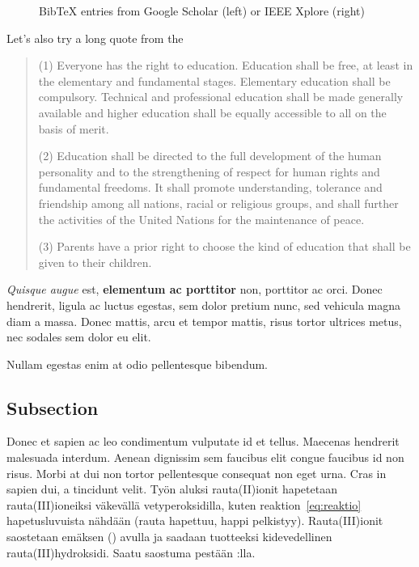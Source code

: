 \begin{figure}[ht]
  \centering
  \caption{BibTeX entries from Google Scholar (left) or IEEE Xplore (right)}
  \label{fig:bibtex}
\end{figure}

Let's also try a long quote from the 
\begin{quote}
(1) Everyone has the right to education. Education shall be free, at least in the elementary and fundamental stages. Elementary education shall be compulsory. Technical and professional education shall be made generally available and higher education shall be equally accessible to all on the basis of merit.

(2) Education shall be directed to the full development of the human personality and to the strengthening of respect for human rights and fundamental freedoms. It shall promote understanding, tolerance and friendship among all nations, racial or religious groups, and shall further the activities of the United Nations for the maintenance of peace.

(3) Parents have a prior right to choose the kind of education that shall be given to their children. \cite[article 26]{un:udhr}
\end{quote}

\textit{Quisque augue} est, \textbf{elementum ac porttitor} non, porttitor ac orci. Donec hendrerit, ligula ac luctus egestas, sem dolor pretium nunc, sed vehicula magna diam a massa. Donec mattis, arcu et tempor mattis, risus tortor ultrices metus, nec sodales sem dolor eu elit.

Nullam egestas enim at odio pellentesque bibendum.

\subsection{Subsection}
Donec et sapien ac leo condimentum vulputate id et tellus. Maecenas hendrerit malesuada interdum. Aenean dignissim sem faucibus elit congue faucibus id non risus. Morbi at dui non tortor pellentesque consequat non eget urna. Cras in sapien dui, a tincidunt velit.
Työn aluksi rauta(II)ionit hapetetaan rauta(III)ioneiksi väkevällä vetyperoksidilla, kuten reaktion~\ref{eq:reaktio} hapetusluvuista nähdään (rauta hapettuu, happi pelkistyy).
Rauta(III)ionit saostetaan emäksen () avulla ja saadaan tuotteeksi kidevedellinen rauta(III)hydroksidi. Saatu saostuma pestään :lla.

